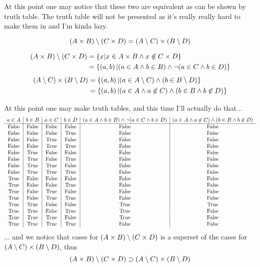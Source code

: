 \documentclass{article}
\begin{document}
At this point one may notice that these two are equivalent as can be shown by truth table. The truth table will not be presented as it's really really hard to make them in \latex and I'm kinda lazy.


\[(A\times B) \setminus (C \times D) = (A \setminus C) \times (B \setminus D)\]

\begin{align*}
(A \times B) \setminus (C \times D) &= \left\{ {x | x \in A\times B \land x \not\in C\times D} \right\} \\
&= \left\{ {\left( a , b \right) | (a \in A \land b \in B) \land \lnot(a \in C \land b \in D)} \right\}
\end{align*}
\begin{align*}
(A \setminus C) \times (B \setminus D) &= \left\{ {\left( a , b \right) | (a \in A \setminus C) \land (b \in B \setminus D)} \right\} \\
&= \left\{ {\left( a , b \right) | (a \in A \land a \not\in C) \land (b \in B \land  b\not\in D)} \right\}
\end{align*}

At this point one may make truth tables, and this time I'll actually do that...
\[
\begin{array}{c|c|c|c|c|c}
a \in A & b \in B & a \in C & b \in D & (a \in A \land b \in B) \land \lnot(a \in C \land b \in D) & (a \in A \land a \not\in C) \land (b \in B \land b \not\in D) \\
\hline
\text{False} & \text{False} & \text{False} & \text{False} & \text{False} & \text{False} \\
\text{False} & \text{False} & \text{False} & \text{True} & \text{False} & \text{False} \\
\text{False} & \text{False} & \text{True} & \text{False} & \text{False} & \text{False} \\
\text{False} & \text{False} & \text{True} & \text{True} & \text{False} & \text{False} \\
\text{False} & \text{True} & \text{False} & \text{False} & \text{False} & \text{False} \\
\text{False} & \text{True} & \text{False} & \text{True} & \text{False} & \text{False} \\
\text{False} & \text{True} & \text{True} & \text{False} & \text{False} & \text{False} \\
\text{False} & \text{True} & \text{True} & \text{True} & \text{False} & \text{False} \\
\text{True} & \text{False} & \text{False} & \text{False} & \text{False} & \text{False} \\
\text{True} & \text{False} & \text{False} & \text{True} & \text{False} & \text{False} \\
\text{True} & \text{False} & \text{True} & \text{False} & \text{False} & \text{False} \\
\text{True} & \text{False} & \text{True} & \text{True} & \text{False}  & \text{False} \\
\text{True} & \text{True} & \text{False} & \text{False} & \text{True} & \text{True} \\
\text{True} & \text{True} & \text{False} & \text{True} & \text{True} & \text{False} \\
\text{True} & \text{True} & \text{True} & \text{False} & \text{True} & \text{False} \\
\text{True} & \text{True} & \text{True} & \text{True} & \text{False} & \text{False}
\end{array}
\]
... and we notice that cases for $(A \times B) \setminus (C \times D)$ is a superset of the cases for $(A \setminus C) \times (B \setminus D)$, thus \[(A\times B) \setminus(C\times D) \supset (A\setminus C) \times (B\setminus D)\]
\end{document}
